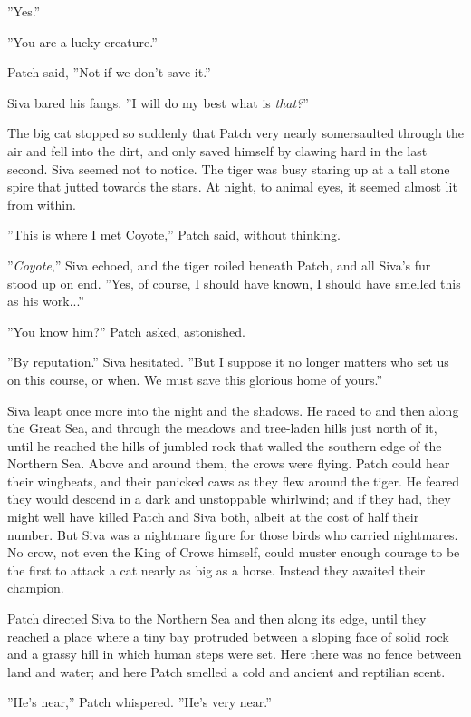 \documentclass[12pt]{book}
\begin{document}
 ''Yes.''\par
 ''You are a lucky creature.''\par
 Patch said, ''Not if we don't save it.''\par
 Siva bared his fangs. ''I will do my best %
 what is {\it that?}''\par
 The big cat stopped so suddenly that Patch very nearly somersaulted through the air and fell into the dirt, and only saved himself by clawing hard in the last second. Siva seemed not to notice. The tiger was busy staring up at a tall stone spire that jutted towards the stars. At night, to animal eyes, it seemed almost lit from within.\par
 ''This is where I met Coyote,'' Patch said, without thinking.\par
 ''{\it Coyote},'' Siva echoed, and the tiger roiled beneath Patch, and all Siva's fur stood up on end. ''Yes, of course, I should have known, I should have smelled this as his work...''\par
 ''You know him?'' Patch asked, astonished.\par
 ''By reputation.'' Siva hesitated. ''But I suppose it no longer matters who set us on this course, or when. We must save this glorious home of yours.''\par
 Siva leapt once more into the night and the shadows. He raced to and then along the Great Sea, and through the meadows and tree-laden hills just north of it, until he reached the hills of jumbled rock that walled the southern edge of the Northern Sea. Above and around them, the crows were flying. Patch could hear their wingbeats, and their panicked caws as they flew around the tiger. He feared they would descend in a dark and unstoppable whirlwind; and if they had, they might well have killed Patch and Siva both, albeit at the cost of half their number. But Siva was a nightmare figure for those birds who carried nightmares. No crow, not even the King of Crows himself, could muster enough courage to be the first to attack a cat nearly as big as a horse. Instead they awaited their champion.\par
 Patch directed Siva to the Northern Sea and then along its edge, until they reached a place where a tiny bay protruded between a sloping face of solid rock and a grassy hill in which human steps were set. Here there was no fence between land and water; and here Patch smelled a cold and ancient and reptilian scent.\par
 ''He's near,'' Patch whispered. ''He's very near.''\par
\end{document}
